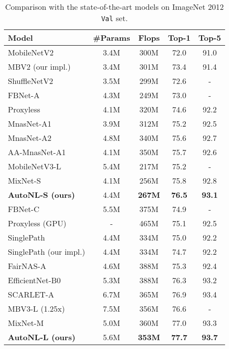 \documentclass[10pt,twocolumn,letterpaper]{article}
\begin{document}
\begin{table}[tb]
\centering
\footnotesize
\begin{tabular}{lcccc}
\toprule
Model & \#Params & Flops & Top-1 & Top-5 \\
\midrule
MobileNetV2 \cite{sandler2018mobilenetv2}     & 3.4M & 300M & 72.0 & 91.0 \\
MBV2 (our impl.)       & 3.4M & 301M & 73.4 & 91.4 \\
ShuffleNetV2 \cite{ma2018shufflenet}         & 3.5M & 299M & 72.6 & - \\
\midrule
FBNet-A \cite{wu2019fbnet}          & 4.3M & 249M & 73.0 & - \\
Proxyless \cite{han2019proxyless}                   & 4.1M & 320M & 74.6 & 92.2 \\
MnasNet-A1~\cite{tan2019mnasnet}       & 3.9M & 312M & 75.2 & 92.5 \\
MnasNet-A2       & 4.8M & 340M & 75.6 & 92.7 \\
AA-MnasNet-A1~\cite{bello2019attention}       & 4.1M & 350M & 75.7 & 92.6 \\
MobileNetV3-L   & 5.4M & 217M & 75.2 & - \\
MixNet-S \cite{tan2019mixnet}       & 4.1M & 256M & 75.8 & 92.8 \\
\textbf{AutoNL-S (ours)}       & 4.4M & \textbf{267M} & \textbf{76.5} & \textbf{93.1} \\
\midrule
FBNet-C~\cite{wu2019fbnet}          & 5.5M & 375M & 74.9 & - \\
Proxyless (GPU)~\cite{han2019proxyless}                     & - & 465M & 75.1 & 92.5 \\
SinglePath~\cite{stamoulis2019single}  & 4.4M & 334M & 75.0 & 92.2 \\
SinglePath (our impl.)  & 4.4M & 334M & 74.7 & 92.2 \\
FairNAS-A~\cite{chu2019scarletnas}     & 4.6M & 388M & 75.3 & 92.4 \\
EfficientNet-B0~\cite{tan2019efficientnet}  & 5.3M & 388M & 76.3 & 93.2 \\
SCARLET-A \cite{chu2019scarletnas}  & 6.7M & 365M & 76.9 & 93.4 \\
MBV3-L (1.25x)~\cite{howard2019searching}    & 7.5M & 356M & 76.6 & - \\
MixNet-M~\cite{tan2019mixnet}       & 5.0M & 360M & 77.0 & 93.3 \\
\textbf{AutoNL-L (ours)}       & 5.6M & \textbf{353M} & \textbf{77.7} & \textbf{93.7} \\
\bottomrule
\end{tabular}
\caption{Comparison with the state-of-the-art models on ImageNet 2012 \texttt{Val} set.}\label{tab:overall_compare}
\vspace{-1em}
\end{table}
\end{document}
